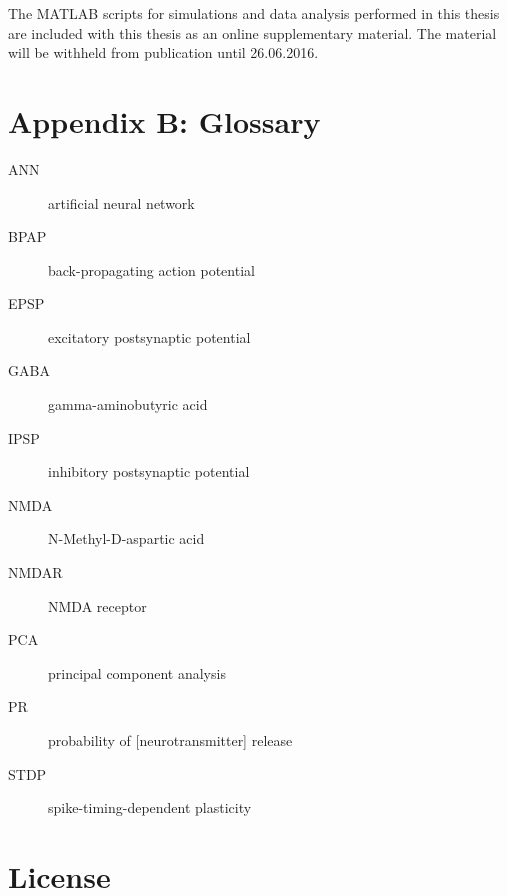 \documentclass[a4paper,12pt]{report}
\theoremstyle{definition}
\begin{document}
The MATLAB scripts for simulations and data analysis performed in this thesis are included with this thesis as an online supplementary material. The material will be withheld from publication until 26.06.2016.







\chapter*{Appendix B: Glossary}
\label{appendix:glossary}

\begin{description}
  \item[ANN] artificial neural network
  \item[BPAP] back-propagating action potential
  \item[EPSP] excitatory postsynaptic potential
  \item[GABA] gamma-aminobutyric acid
  \item[IPSP] inhibitory postsynaptic potential
  \item[NMDA] N-Methyl-D-aspartic acid
  \item[NMDAR] NMDA receptor
  \item[PCA] principal component analysis
  \item[PR] probability of [neurotransmitter] release
  \item[STDP] spike-timing-dependent plasticity
\end{description}





\chapter*{License}


%
%
\end{document}
